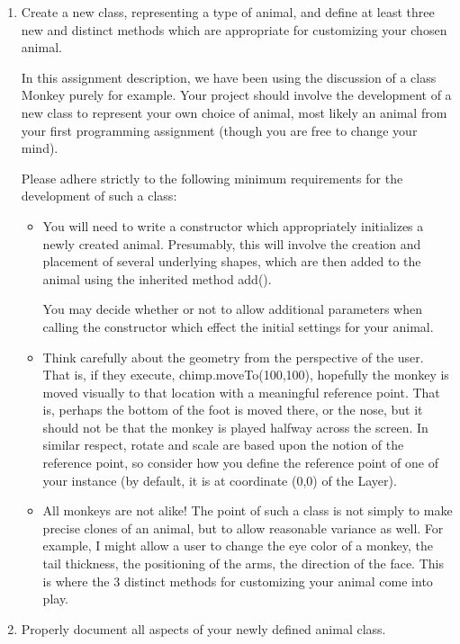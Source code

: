 \documentclass[11pt]{article}
\begin{document}
\begin{enumerate}
\item
Create a new class, representing a type of animal, and define at
least three new and distinct methods which are appropriate for
customizing your chosen animal.

In this assignment description, we have been using the discussion of
a class Monkey purely for example. Your project should involve the
development of a new class to represent your own choice of animal,
most likely an animal from your first programming assignment (though
you are free to change your mind).

Please adhere strictly to the following minimum requirements for the
development of such a class:

\begin{itemize}

\item You will need to write a constructor which appropriately
initializes a newly created animal. Presumably, this will involve
the creation and placement of several underlying shapes, which are
then added to the animal using the inherited method add().

You may decide whether or not to allow additional parameters when
calling the constructor which effect the initial settings for your
animal.


\item Think carefully about the geometry from the perspective of the
user. That is, if they execute, chimp.moveTo(100,100), hopefully the
monkey is moved visually to that location with a meaningful
reference point. That is, perhaps the bottom of the foot is moved
there, or the nose, but it should not be that the monkey is played
halfway across the screen. In similar respect, rotate and scale are
based upon the notion of the reference point, so consider how you
define the reference point of one of your instance (by default, it
is at coordinate (0,0) of the Layer).


\item All monkeys are not alike! The point of such a class is not
simply to make precise clones of an animal, but to allow reasonable
variance as well. For example, I might allow a user to change the
eye color of a monkey, the tail thickness, the positioning of the
arms, the direction of the face.  This is where the 3 distinct
methods for customizing your animal come into play.
\end{itemize}

\item Properly document all aspects of your newly defined animal class.


\end{enumerate}
\end{document}
